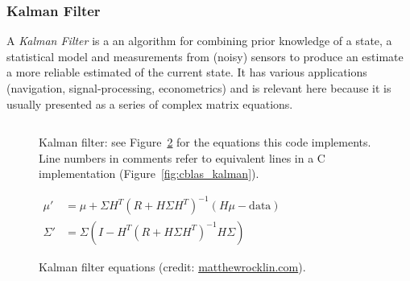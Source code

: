 \subsubsection{Kalman Filter}

A \emph{Kalman Filter}\cite{kalman} is a an algorithm for combining prior
knowledge of a state, a statistical model and measurements from (noisy) sensors
to produce an estimate a more reliable estimated of the current state.  It has
various applications (navigation, signal-processing, econometrics) and is
relevant here because it is usually presented as a series of complex matrix
equations.

\begin{figure}[t]
    \centering
    \inputminted[fontsize=\small]{ocaml}{../../examples/kalman.lt}
    \caption{Kalman filter: see Figure~\ref{fig:kalman_eqns} for the
        equations this code implements. Line numbers in comments refer to
        equivalent lines in a C implementation
        (Figure~\ref{fig:cblas_kalman}).}\label{fig:lang_kalman}
\end{figure}

\begin{figure}[t]
    {\centering
    $  \displaystyle
    \begin{aligned}
        \mu' &= \mu + \Sigma H^T (R + H \Sigma H^T)^{-1} (H \mu - \textrm{data})\\
        \Sigma' &= \Sigma ( I - H^T (R + H \Sigma H^T)^{-1} H \Sigma )
    \end{aligned}
    $ \par}
    \caption{Kalman filter equations (credit:
    \href{http://matthewrocklin.com/blog/work/2012/11/24/Kalman-Filter}{matthewrocklin.com}).}\label{fig:kalman_eqns}
\end{figure}

